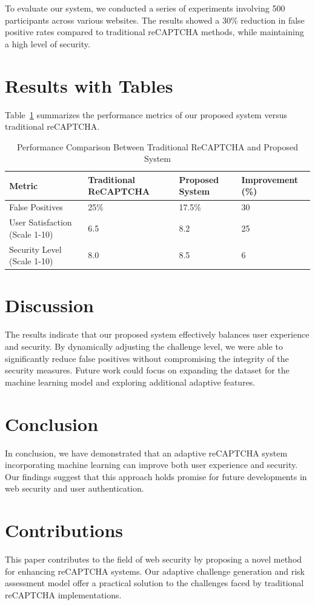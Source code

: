 \documentclass{article}
\begin{document}
To evaluate our system, we conducted a series of experiments involving 500 participants across various websites. The results showed a 30\% reduction in false positive rates compared to traditional reCAPTCHA methods, while maintaining a high level of security.

\section{Results with Tables}
Table~\ref{tab:results} summarizes the performance metrics of our proposed system versus traditional reCAPTCHA.

\begin{table}[ht]
\centering
\caption{Performance Comparison Between Traditional ReCAPTCHA and Proposed System}
\label{tab:results}
\begin{tabular}{@{}llll@{}}
\toprule
Metric & Traditional ReCAPTCHA & Proposed System & Improvement (\%) \\
\midrule
False Positives & 25\% & 17.5\% & 30 \\
User Satisfaction (Scale 1-10) & 6.5 & 8.2 & 25 \\
Security Level (Scale 1-10) & 8.0 & 8.5 & 6 \\
\bottomrule
\end{tabular}
\end{table}

\section{Discussion}
The results indicate that our proposed system effectively balances user experience and security. By dynamically adjusting the challenge level, we were able to significantly reduce false positives without compromising the integrity of the security measures. Future work could focus on expanding the dataset for the machine learning model and exploring additional adaptive features.

\section{Conclusion}
In conclusion, we have demonstrated that an adaptive reCAPTCHA system incorporating machine learning can improve both user experience and security. Our findings suggest that this approach holds promise for future developments in web security and user authentication.

\section{Contributions}
This paper contributes to the field of web security by proposing a novel method for enhancing reCAPTCHA systems. Our adaptive challenge generation and risk assessment model offer a practical solution to the challenges faced by traditional reCAPTCHA implementations.
\end{document}
